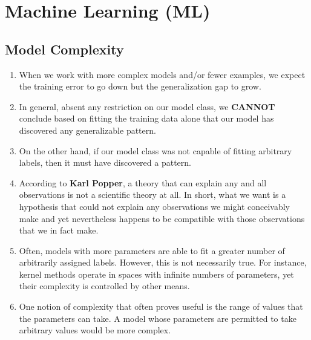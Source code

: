\chapter{Machine Learning (ML)}








\section{Model Complexity \cite{dnn-1}}
\begin{enumerate}[itemsep=0.2cm]
    \item When we work with more complex models and/or fewer examples, we expect the training error to go down but the generalization gap to grow. \cite{dnn-1}

    \item In general, absent any restriction on our model class, we \textbf{CANNOT} conclude based on fitting the training data alone that our model has discovered any generalizable pattern. \cite{dnn-1}

    \item On the other hand, if our model class was not capable of fitting arbitrary labels, then it must have discovered a pattern. \cite{dnn-1}

    \item According to \textbf{Karl Popper}, a theory that can explain any and all observations is not a scientific theory at all. In short, what we want is a hypothesis that could not explain any observations we might conceivably make and yet nevertheless happens to be compatible with those observations that we in fact make. \cite{dnn-1}

    \item Often, models with more parameters are able to fit a greater number of arbitrarily assigned labels. However, this is not necessarily true. For instance, kernel methods operate in spaces with infinite numbers of parameters, yet their complexity is controlled by other means.

    \item One notion of complexity that often proves useful is the range of values that the parameters can take. A model whose parameters are permitted to take arbitrary values would be more complex.


\end{enumerate}
